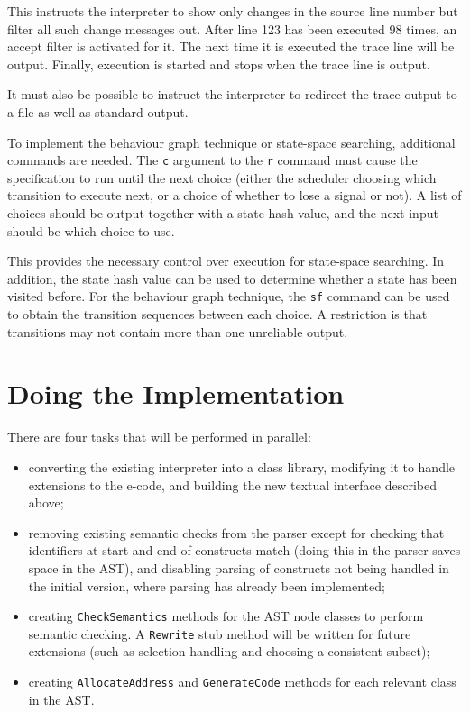 This instructs the interpreter to show only changes in the source line
number but filter all such change messages out. After line 123 has
been executed 98 times, an accept filter is activated for it. The
next time it is executed the trace line will be output. Finally,
execution is started and stops when the trace line is output.

It must also be possible to instruct the interpreter to redirect the
trace output to a file as well as standard output.

To implement the behaviour graph technique or state-space searching,
additional commands are needed. The {\tt c} argument to the {\tt r}
command must cause the specification to run until the next choice
(either the scheduler choosing which transition to execute next,
or a choice of whether to lose a signal or not). A list of choices
should be output together with a state hash value, and the next input
should be which choice to use.

This provides the necessary control over execution for state-space
searching. In addition, the state hash value can be used to determine 
whether a state has been visited before. For the behaviour graph
technique, the {\tt sf} command can be used to obtain the transition
sequences between each choice. A restriction is that transitions may
not contain more than one unreliable output.

\section{Doing the Implementation}

There are four tasks that will be performed in parallel:

\begin{itemize}
\item converting the existing interpreter into a class library,
modifying it to handle extensions to the e-code, and building the new
textual interface described above;
\item removing existing semantic checks from the parser except
for checking that identifiers at start and end of constructs match
(doing this in the parser saves space in the AST),
and disabling parsing of constructs not being handled in the initial
version, where parsing has already been implemented;
\item creating {\tt CheckSemantics} methods for the AST node classes
to perform semantic checking. A {\tt Rewrite} stub method will
be written for future extensions (such as selection handling and
choosing a consistent subset);
\item creating {\tt AllocateAddress} and {\tt GenerateCode} methods
for each relevant class in the AST.
\end{itemize}



